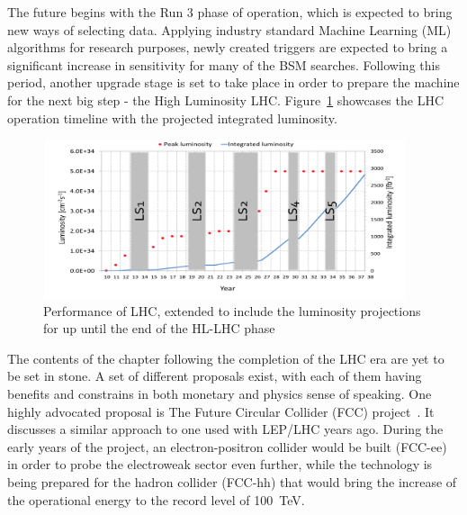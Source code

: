 \hspace{10pt} The future begins with the Run 3 phase of operation, which is expected to bring new ways of selecting data. Applying industry standard Machine Learning (ML) algorithms for research purposes, newly created triggers are expected to bring a significant increase in sensitivity for many of the BSM searches. Following this period, another upgrade stage is set to take place in order to prepare the machine for the next big step - the High Luminosity LHC. Figure~\ref{fig:lhc} showcases the LHC operation timeline with the projected integrated luminosity. 

\begin{figure}[htbp]
  \centering
    \includegraphics[width=0.95\textwidth]{CMS_experiment/LHC_integrated_lumi.png}
  \caption[Performance of LHC, extended to include the luminosity projections for up until the end of the HL-LHC phase.]{Performance of LHC, extended to include the luminosity projections for up until the end of the HL-LHC phase~\cite{ref:Schmidt_2016}}
  \label{fig:lhc}
\end{figure}


\hspace{10pt} The contents of the chapter following the completion of the LHC era are yet to be set in stone. A set of different proposals exist, with each of them having benefits and constrains in both monetary and physics sense of speaking. One highly advocated proposal is The Future Circular Collider (FCC) project~\cite{FCC_CDR}. It discusses a similar approach to one used with LEP/LHC years ago. During the early years of the project, an electron-positron collider would be built (FCC-ee) in order to probe the electroweak sector even further, while the technology is being prepared for the hadron collider (FCC-hh) that would bring the increase of the operational energy to the record level of 100~TeV. 



